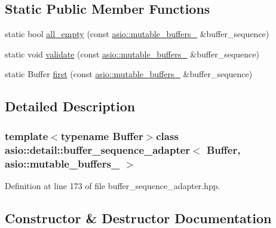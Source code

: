 \subsection*{Static Public Member Functions}
\begin{DoxyCompactItemize}
\item 
static bool \hyperlink{classasio_1_1detail_1_1buffer__sequence__adapter_3_01_buffer_00_01asio_1_1mutable__buffers__1_01_4_a2a9b642d503a62ee9d30a6fdd4a741ff}{all\+\_\+empty} (const \hyperlink{classasio_1_1mutable__buffers__1}{asio\+::mutable\+\_\+buffers\+\_} \&buffer\+\_\+sequence)
\item 
static void \hyperlink{classasio_1_1detail_1_1buffer__sequence__adapter_3_01_buffer_00_01asio_1_1mutable__buffers__1_01_4_a3f79393f7334c6af7c3f1ccdc4cbbe45}{validate} (const \hyperlink{classasio_1_1mutable__buffers__1}{asio\+::mutable\+\_\+buffers\+\_} \&buffer\+\_\+sequence)
\item 
static Buffer \hyperlink{classasio_1_1detail_1_1buffer__sequence__adapter_3_01_buffer_00_01asio_1_1mutable__buffers__1_01_4_a84499ce9820f6ede20c4dc6ed099d7dc}{first} (const \hyperlink{classasio_1_1mutable__buffers__1}{asio\+::mutable\+\_\+buffers\+\_} \&buffer\+\_\+sequence)
\end{DoxyCompactItemize}


\subsection{Detailed Description}
\subsubsection*{template$<$typename Buffer$>$class asio\+::detail\+::buffer\+\_\+sequence\+\_\+adapter$<$ Buffer, asio\+::mutable\+\_\+buffers\+\_ $>$}



Definition at line 173 of file buffer\+\_\+sequence\+\_\+adapter.\+hpp.



\subsection{Constructor \& Destructor Documentation}
\hypertarget{classasio_1_1detail_1_1buffer__sequence__adapter_3_01_buffer_00_01asio_1_1mutable__buffers__1_01_4_ab715e3ff9e43b4182850edd18a0881fb}{}
